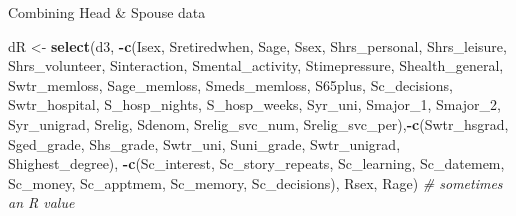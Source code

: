 \documentclass[]{article}
\newenvironment{Shaded}{\begin{snugshade}}{\end{snugshade}}
\newcommand{\CommentTok}[1]{\textcolor[rgb]{0.56,0.35,0.01}{\textit{#1}}}
\newcommand{\DecValTok}[1]{\textcolor[rgb]{0.00,0.00,0.81}{#1}}
\newcommand{\KeywordTok}[1]{\textcolor[rgb]{0.13,0.29,0.53}{\textbf{#1}}}
\newcommand{\NormalTok}[1]{#1}
\newcommand{\OperatorTok}[1]{\textcolor[rgb]{0.81,0.36,0.00}{\textbf{#1}}}
\newcommand{\StringTok}[1]{\textcolor[rgb]{0.31,0.60,0.02}{#1}}
\begin{document}
Combining Head \& Spouse data

\begin{Shaded}
\begin{Highlighting}[]
\NormalTok{dR <-}\StringTok{ }\KeywordTok{select}\NormalTok{(d3, }\OperatorTok{-}\KeywordTok{c}\NormalTok{(Isex, Sretiredwhen, Sage, Ssex, Shrs_personal, Shrs_leisure, Shrs_volunteer, Sinteraction, Smental_activity, Stimepressure, Shealth_general, Swtr_memloss, Sage_memloss, Smeds_memloss, S65plus, Sc_decisions, Swtr_hospital, S_hosp_nights, S_hosp_weeks, Syr_uni, Smajor_}\DecValTok{1}\NormalTok{, Smajor_}\DecValTok{2}\NormalTok{, Syr_unigrad, Srelig, Sdenom, Srelig_svc_num, Srelig_svc_per),}\OperatorTok{-}\KeywordTok{c}\NormalTok{(Swtr_hsgrad, Sged_grade, Shs_grade, Swtr_uni, Suni_grade, Swtr_unigrad, Shighest_degree), }\OperatorTok{-}\KeywordTok{c}\NormalTok{(Sc_interest, Sc_story_repeats, Sc_learning, Sc_datemem, Sc_money, Sc_apptmem, Sc_memory, Sc_decisions), Rsex, Rage) }\CommentTok{# sometimes an R value}



\end{Highlighting}
\end{Shaded}
\end{document}

